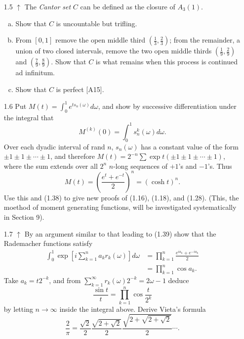 \documentclass[letterpaper, 12pt]{article}
\newcommand{\skoi}{\sum_{k=1}^\infty}
\begin{document}
\begin{enumerate}
\item[1.5]
$\uparrow$ The \textit{Cantor set} $C$ can be defined as the closure of $A_3(1)$.
\begin{enumerate}[(a)]
\item
Show that $C$ is uncountable but trifling.
\item
From $[0,1]$ remove the open middle third $\left(\frac{1}{3}, \frac{2}{3}\right)$; from the remainder, a union of two closed intervals, remove the two open middle thirds $\left(\frac{1}{9},\frac{2}{9}\right)$ and $\left(\frac{7}{9},\frac{8}{9}\right)$. Show that $C$ is what remains when this process is continued ad infinitum.
\item
Show that $C$ is perfect [A15].
\end{enumerate}

\item[1.6]
Put $M(t) = \int_0^1 e^{ts_n(\omega)} d\omega$, and show by successive differentiation under the integral that
\begin{equation}
M^{(k)}(0) = \int_0^1 s_n^k(\omega) d\omega.
\end{equation}
Over each dyadic interval of rand $n$, $s_n(\omega)$ has a constant value of the form $\pm 1 \pm 1 \pm \cdots \pm 1$, and therefore $M(t) = 2^{-n} \sum \exp t(\pm 1 \pm 1 \pm \cdots \pm 1)$, where the sum extends over all $2^n$ $n$-long sequences of $+1$'s and $-1$'s. Thus
\begin{equation}
M(t) = \left(  \frac{e^t+e^{-t}}{2}   \right) ^n = (\cosh t)^n.
\end{equation}
Use this and (1.38) to give new proofs of (1.16), (1.18), and (1.28). (This, the moethod of moment generating functions, will be investigated systematically in Section 9).

\item[1.7]
$\uparrow$ By an argument similar to that leading to (1.39) show that the Rademacher functions satisfy
\begin{align}
\int_0^1 \exp \left[ i \sum_{k=1}^n a_k r_k(\omega) \right] d\omega
&=
\prod_{k=1}^n \frac{e^{ia_k} + e^{-ia_k}}{2}
\\
&= \prod_{k=1}^n \cos a_k.
\end{align}
Take $a_k = t2^{-k}$, and from $\skoi r_k(\omega) 2^{-k} = 2\omega -1$ deduce
\begin{equation}
\frac{\sin t}{t} = \prod_{k=1}^n \cos \frac{t}{2^k}
\end{equation}
by letting $n \to \infty$ inside the integral above. Derive Vieta's formula
\begin{equation}
\frac{2}{\pi} = \frac{\sqrt{2}}{2} \frac{\sqrt{2 + \sqrt{2}}}{2} 
\frac{\sqrt{2 + \sqrt{2 + \sqrt{2}}}}{2} \cdots.
\end{equation}

\end{enumerate}
\end{document}
